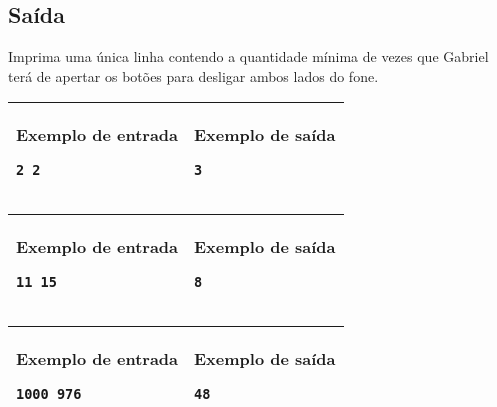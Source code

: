 \subsection*{Saída}
Imprima uma única linha contendo a quantidade mínima de vezes que Gabriel terá de apertar os botões para desligar ambos lados do fone.

\newpage
\begin{table}[!h]
\centering
\begin{tabular}{|l|l|}
\hline
\begin{minipage}[t]{3in}
\textbf{Exemplo de entrada}
\begin{verbatim}
2 2
\end{verbatim}
\vspace{1mm}
\end{minipage}
&
\begin{minipage}[t]{3in}
\textbf{Exemplo de saída}
\begin{verbatim}
3
\end{verbatim}
\vspace{1mm}
\end{minipage} \\
\hline
\end{tabular}
\end{table}

\begin{table}[!h]
\centering
\begin{tabular}{|l|l|}
\hline
\begin{minipage}[t]{3in}
\textbf{Exemplo de entrada}
\begin{verbatim}
11 15
\end{verbatim}
\vspace{1mm}
\end{minipage}
&
\begin{minipage}[t]{3in}
\textbf{Exemplo de saída}
\begin{verbatim}
8
\end{verbatim}
\vspace{1mm}
\end{minipage} \\
\hline
\end{tabular}
\end{table}

\begin{table}[!h]
\centering
\begin{tabular}{|l|l|}
\hline
\begin{minipage}[t]{3in}
\textbf{Exemplo de entrada}
\begin{verbatim}
1000 976
\end{verbatim}
\vspace{1mm}
\end{minipage}
&
\begin{minipage}[t]{3in}
\textbf{Exemplo de saída}
\begin{verbatim}
48
\end{verbatim}
\vspace{1mm}
\end{minipage} \\
\hline
\end{tabular}
\end{table}

